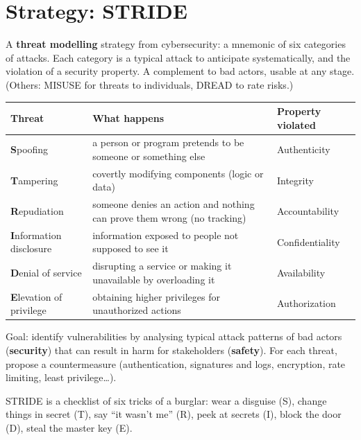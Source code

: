 \documentclass[11pt,a4paper,openany]{book}
\begin{document}
\section{Strategy: STRIDE}

\begin{defnbox}[title={STRIDE (Microsoft)}]
A \textbf{threat modelling} strategy from cybersecurity: a mnemonic of six categories of attacks.
Each category is a typical attack to anticipate systematically, and the violation of a security
property. A complement to bad actors, usable at any stage. (Others: MISUSE for threats to
individuals, DREAD to rate risks.)
\begin{center}
\begin{tabularx}{\linewidth}{l X l}
\textbf{Threat} & \textbf{What happens} & \textbf{Property violated} \\ \hline
\textbf{S}poofing & a person or program pretends to be someone or something else & Authenticity \\
\textbf{T}ampering & covertly modifying components (logic or data) & Integrity \\
\textbf{R}epudiation & someone denies an action and nothing can prove them wrong (no tracking) & Accountability \\
\textbf{I}nformation disclosure & information exposed to people not supposed to see it & Confidentiality \\
\textbf{D}enial of service & disrupting a service or making it unavailable by overloading it & Availability \\
\textbf{E}levation of privilege & obtaining higher privileges for unauthorized actions & Authorization
\end{tabularx}
\end{center}
\end{defnbox}

\begin{keybox}
Goal: identify vulnerabilities by analysing typical attack patterns of bad actors
(\textbf{security}) that can result in harm for stakeholders (\textbf{safety}). For each threat,
propose a countermeasure (authentication, signatures and logs, encryption, rate limiting,
least privilege\ldots).
\end{keybox}

\begin{goatbox}
STRIDE is a checklist of six tricks of a burglar: wear a disguise (S), change things in secret
(T), say ``it wasn't me'' (R), peek at secrets (I), block the door (D), steal the master key (E).
\end{goatbox}
\end{document}
